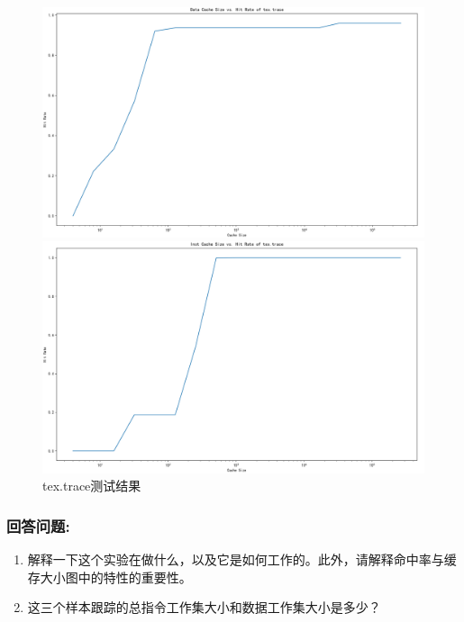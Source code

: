\documentclass[12pt,hyperref,a4paper,UTF8]{ctexart}
\begin{document}
\begin{figure}[H]
    \centering
    \begin{minipage}[b]{0.45\textwidth}
        \centering
        \includegraphics[width=\textwidth]{./figures/fig/image19.png}
    \end{minipage}
    \hfill
    \begin{minipage}[b]{0.45\textwidth}
        \centering
        \includegraphics[width=\textwidth]{./figures/fig/image20.png}
    \end{minipage}
    \caption{tex.trace测试结果}
\end{figure}

\subsubsection*{回答问题:}
\begin{enumerate}
    \item 解释一下这个实验在做什么，以及它是如何工作的。此外，请解释命中率与缓存大小图中的特性的重要性。

    \item 这三个样本跟踪的总指令工作集大小和数据工作集大小是多少？
\end{enumerate}
\end{document}
